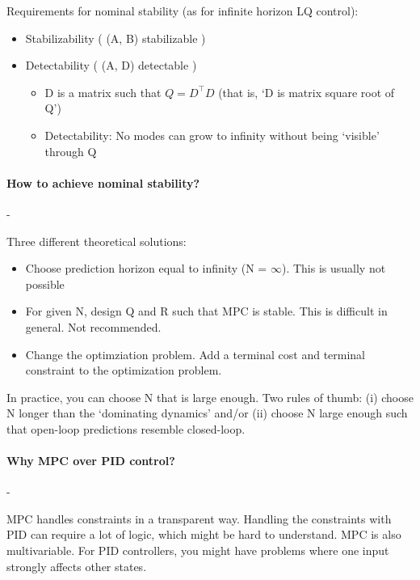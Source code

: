 \documentclass{article}
\begin{document}
Requirements for nominal stability (as for infinite horizon LQ control):
\begin{itemize}
  \item Stabilizability ( (A, B) stabilizable )
  \item Detectability ( (A, D) detectable )
  \begin{itemize}
    \item D is a matrix such that $Q = D^{\top}D$ (that is, `D is matrix square root of Q')
    \item Detectability: No modes can grow to infinity without being `visible' through Q
  \end{itemize}
\end{itemize}

\paragraph{How to achieve nominal stability?}- 

\medskip Three different theoretical solutions: 
\begin{itemize}
  \item Choose prediction horizon equal to infinity (N = $\infty$). This is usually not possible
  \item For given N, design Q and R such that MPC is stable. This is difficult in general. Not recommended.
  \item Change the optimziation problem. Add a terminal cost and terminal constraint to the optimization problem. 
\end{itemize}

In practice, you can choose N that is large enough. Two rules of thumb: (i) choose N longer than the `dominating dynamics' and/or (ii) choose N large enough such that 
open-loop predictions resemble closed-loop. 

\paragraph{Why MPC over PID control?}- 

\medskip MPC handles constraints in a transparent way. Handling the constraints with PID can require a lot of logic, which might be hard to understand. 
MPC is also multivariable. For PID controllers, you might have problems where one input strongly affects other states.  
\end{document}
